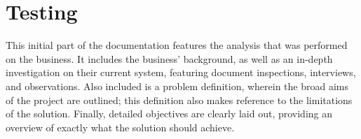 \clearpage

\part{Testing} %
\label{prt:testing_}
This initial part of the documentation features the analysis that was performed on the business. It includes the business' background, as well as an in-depth investigation on their current system, featuring document inspections, interviews, and observations. Also included is a problem definition, wherein the broad aims of the project are outlined; this definition also makes reference to the limitations of the solution. Finally, detailed objectives are clearly laid out, providing an overview of exactly what the solution should achieve.






